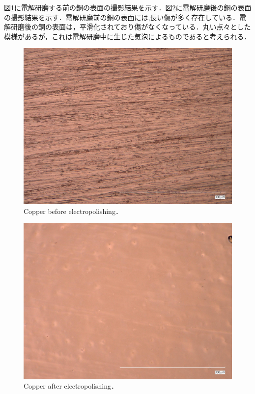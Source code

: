 図\ref{fig:Cu}に電解研磨する前の銅の表面の撮影結果を示す．図\ref{fig:Cuele}に電解研磨後の銅の表面の撮影結果を示す．電解研磨前の銅の表面には,長い傷が多く存在している．電解研磨後の銅の表面は，平滑化されており傷がなくなっている．丸い点々とした模様があるが，これは電解研磨中に生じた気泡によるものであると考えられる．
\begin{figure}[htbp]
    \centering %
    \includegraphics[width=100truemm,clip]{fig/241218_Cu_600.jpg}
    \caption{Copper before electropolishing．}
    \label{fig:Cu}
\end{figure}
\begin{figure}[htbp]
    \centering %
    \includegraphics[width=100truemm,clip]{fig/241218_Cu_ele.jpg}
    \caption{Copper after electropolishing．}
    \label{fig:Cuele}
\end{figure}

\clearpage